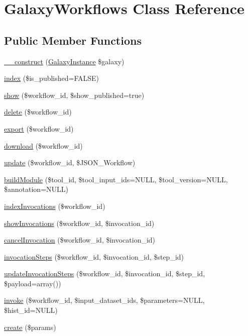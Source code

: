 \hypertarget{classGalaxyWorkflows}{\section{Galaxy\-Workflows Class Reference}
\label{classGalaxyWorkflows}
}
\subsection*{Public Member Functions}
\begin{DoxyCompactItemize}
\item 
\hyperlink{classGalaxyWorkflows_ad433dc7aecc2d5267209fe5a725dc46f}{\-\_\-\-\_\-construct} (\hyperlink{classGalaxyInstance}{Galaxy\-Instance} \$galaxy)
\item 
\hyperlink{classGalaxyWorkflows_a98191c8d0819151ed0e1fcf926edda93}{index} (\$is\-\_\-published=F\-A\-L\-S\-E)
\item 
\hyperlink{classGalaxyWorkflows_a2db04c6d0e649fbf026906233e854091}{show} (\$workflow\-\_\-id, \$show\-\_\-published=true)
\item 
\hyperlink{classGalaxyWorkflows_ab5ae3640a3fadef9faea67fff6a927b2}{delete} (\$workflow\-\_\-id)
\item 
\hyperlink{classGalaxyWorkflows_ae1297b1c2660208e30657020ab6b1c53}{export} (\$workflow\-\_\-id)
\item 
\hyperlink{classGalaxyWorkflows_afb0322ba8b681e190e7101b269f37249}{download} (\$workflow\-\_\-id)
\item 
\hyperlink{classGalaxyWorkflows_af435376a78f549a7c59f5969bdb249e1}{update} (\$workflow\-\_\-id, \$J\-S\-O\-N\-\_\-\-Workflow)
\item 
\hyperlink{classGalaxyWorkflows_ade6c11a1bb22019babfb880b9a5c5d80}{build\-Module} (\$tool\-\_\-id, \$tool\-\_\-input\-\_\-ids=N\-U\-L\-L, \$tool\-\_\-version=N\-U\-L\-L, \$annotation=N\-U\-L\-L)
\item 
\hyperlink{classGalaxyWorkflows_ae854a683f8a3ebeed7f748853e2a74e7}{index\-Invocations} (\$workflow\-\_\-id)
\item 
\hyperlink{classGalaxyWorkflows_a2c181ced20cf625a8b23d4802fc745fe}{show\-Invocations} (\$workflow\-\_\-id, \$invocation\-\_\-id)
\item 
\hyperlink{classGalaxyWorkflows_afa960b0caa0b7d888f49f92441cfa71a}{cancel\-Invocation} (\$workflow\-\_\-id, \$invocation\-\_\-id)
\item 
\hyperlink{classGalaxyWorkflows_a8723202d8d7fe1fe8132ce9193d3279c}{invocation\-Steps} (\$workflow\-\_\-id, \$invocation\-\_\-id, \$step\-\_\-id)
\item 
\hyperlink{classGalaxyWorkflows_a8570fdd04ce133d45fef7716e1525ae6}{update\-Invocation\-Steps} (\$workflow\-\_\-id, \$invocation\-\_\-id, \$step\-\_\-id, \$payload=array())
\item 
\hyperlink{classGalaxyWorkflows_ac2e76982f5666761dd1ed95654b57834}{invoke} (\$workflow\-\_\-id, \$input\-\_\-dataset\-\_\-ids, \$parameters=N\-U\-L\-L, \$hist\-\_\-id=N\-U\-L\-L)
\item 
\hyperlink{classGalaxyWorkflows_adc1bca96c095e4681b7e9f17ad38e72b}{create} (\$params)
\end{DoxyCompactItemize}


